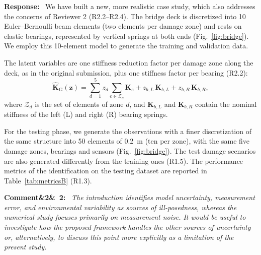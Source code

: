\documentclass[11pt]{article}
\newenvironment{rcomment}[1]{\par\bigskip\noindent\textbf{Comment\ifx&#1&\else\ #1\fi:}\ \itshape}{\par}
\newenvironment{response}{\par\smallskip\noindent\color{resp}\textbf{Response:}\ }{\par}
\newcommand{\z}{\mathbf{z}}
\begin{document}
\begin{response}
We have  built a new, more realistic case study, which also addresses the
concerns of Reviewer 2 (R2.2--R2.4). The bridge deck is discretized into 10 Euler--Bernoulli beam elements (two elements per damage zone) and rests on elastic bearings, represented by vertical springs at both ends (Fig.~\ref{fig:bridge}). 
We employ this 10-element model to generate the training and validation data.

The latent variables are one stiffness reduction factor per damage zone along the deck, as in the original submission, plus one stiffness factor per bearing (R2.2):
\begin{equation}
\hat{\mathbf{K}}_{\mathrm{G}}(\z)=\sum_{d=1}^{5} z_d\sum_{e\in\mathcal{Z}_d}\mathbf{K}_{e}
+z_{b,L}\,\mathbf{K}_{b,L}+z_{b,R}\,\mathbf{K}_{b,R},
\label{eq:Kz}
\end{equation}
where $\mathcal{Z}_d$ is the set of elements of zone $d$, and $\mathbf{K}_{b,L}$ and $\mathbf{K}_{b,R}$ contain the nominal stiffness of the left (L) and right (R) bearing springs.

For the testing phase, we generate the observations with a finer discretization of the same structure into 50 elements
of 0.2~m (ten per zone), with the same five damage zones, bearings and sensors (Fig.~\ref{fig:bridge}). The test damage
scenarios are also generated differently from the training ones (R1.5).
The performance metrics of the identification on the testing dataset are reported in Table~\ref{tab:metricsB} (R1.3).
\end{response}

\begin{rcomment}{2}
The introduction identifies model uncertainty, measurement error, and environmental variability as sources of
ill-posedness, whereas the numerical study focuses primarily on measurement noise. It would be useful to investigate how
the proposed framework handles the other sources of uncertainty or, alternatively, to discuss this point more explicitly
as a limitation of the present study.
\end{rcomment}
\end{document}
